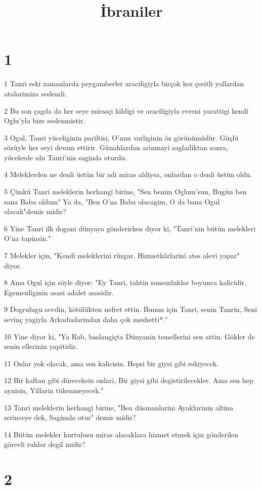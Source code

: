 

\title{İbraniler}


\chapter{1}

\par 1 Tanri eski zamanlarda peygamberler araciligiyla birçok kez çesitli yollardan atalarimiza seslendi.
\par 2 Bu son çagda da her seye mirasçi kildigi ve araciligiyla evreni yarattigi kendi Oglu'yla bize seslenmistir.
\par 3 Ogul, Tanri yüceliginin pariltisi, O'nun varliginin öz görünümüdür. Güçlü sözüyle her seyi devam ettirir. Günahlardan arinmayi sagladiktan sonra, yücelerde ulu Tanri'nin saginda oturdu.
\par 4 Meleklerden ne denli üstün bir adi miras aldiysa, onlardan o denli üstün oldu.
\par 5 Çünkü Tanri meleklerin herhangi birine, "Sen benim Oglum'sun, Bugün ben sana Baba oldum" Ya da, "Ben O'na Baba olacagim, O da bana Ogul olacak"demis midir?
\par 6 Yine Tanri ilk dogani dünyaya gönderirken diyor ki, "Tanri'nin bütün melekleri O'na tapinsin."
\par 7 Melekler için, "Kendi meleklerini rüzgar, Hizmetkârlarini ates alevi yapar" diyor.
\par 8 Ama Ogul için söyle diyor: "Ey Tanri, tahtin sonsuzluklar boyunca kalicidir, Egemenliginin asasi adalet asasidir.
\par 9 Dogrulugu sevdin, kötülükten nefret ettin. Bunun için Tanri, senin Tanrin, Seni sevinç yagiyla Arkadaslarindan daha çok meshetti*."
\par 10 Yine diyor ki, "Ya Rab, baslangiçta Dünyanin temellerini sen attin. Gökler de senin ellerinin yapitidir.
\par 11 Onlar yok olacak, ama sen kalicisin. Hepsi bir giysi gibi eskiyecek.
\par 12 Bir kaftan gibi düreceksin onlari, Bir giysi gibi degistirilecekler. Ama sen hep aynisin, Yillarin tükenmeyecek."
\par 13 Tanri meleklerin herhangi birine, "Ben düsmanlarini Ayaklarinin altina serinceye dek, Sagimda otur" demis midir?
\par 14 Bütün melekler kurtulusu miras alacaklara hizmet etmek için gönderilen görevli ruhlar degil midir?

\chapter{2}

